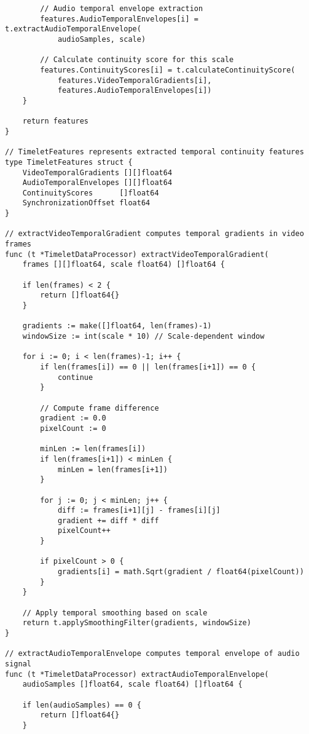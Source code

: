 \begin{tcolorbox}[colback=CodeBackground, colframe=DarkGray, title=Video-Audio Dataset Processing, fonttitle=\bfseries]
\begin{verbatim}
        // Audio temporal envelope extraction
        features.AudioTemporalEnvelopes[i] = t.extractAudioTemporalEnvelope(
            audioSamples, scale)
        
        // Calculate continuity score for this scale
        features.ContinuityScores[i] = t.calculateContinuityScore(
            features.VideoTemporalGradients[i], 
            features.AudioTemporalEnvelopes[i])
    }
    
    return features
}

// TimeletFeatures represents extracted temporal continuity features
type TimeletFeatures struct {
    VideoTemporalGradients [][]float64
    AudioTemporalEnvelopes [][]float64
    ContinuityScores      []float64
    SynchronizationOffset float64
}

// extractVideoTemporalGradient computes temporal gradients in video frames
func (t *TimeletDataProcessor) extractVideoTemporalGradient(
    frames [][]float64, scale float64) []float64 {
    
    if len(frames) < 2 {
        return []float64{}
    }
    
    gradients := make([]float64, len(frames)-1)
    windowSize := int(scale * 10) // Scale-dependent window
    
    for i := 0; i < len(frames)-1; i++ {
        if len(frames[i]) == 0 || len(frames[i+1]) == 0 {
            continue
        }
        
        // Compute frame difference
        gradient := 0.0
        pixelCount := 0
        
        minLen := len(frames[i])
        if len(frames[i+1]) < minLen {
            minLen = len(frames[i+1])
        }
        
        for j := 0; j < minLen; j++ {
            diff := frames[i+1][j] - frames[i][j]
            gradient += diff * diff
            pixelCount++
        }
        
        if pixelCount > 0 {
            gradients[i] = math.Sqrt(gradient / float64(pixelCount))
        }
    }
    
    // Apply temporal smoothing based on scale
    return t.applySmoothingFilter(gradients, windowSize)
}

// extractAudioTemporalEnvelope computes temporal envelope of audio signal
func (t *TimeletDataProcessor) extractAudioTemporalEnvelope(
    audioSamples []float64, scale float64) []float64 {
    
    if len(audioSamples) == 0 {
        return []float64{}
    }
    

\end{verbatim}
\end{tcolorbox}
